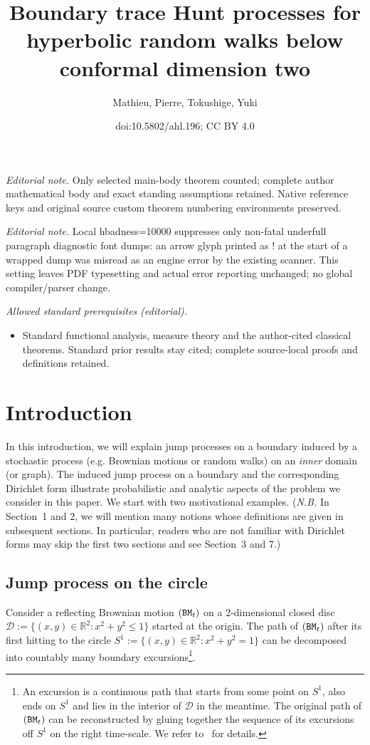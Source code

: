 \documentclass[10pt]{amsart}
\title{Boundary trace Hunt processes for hyperbolic random walks below conformal dimension two}
\author{Mathieu, Pierre, Tokushige, Yuki}
\date{doi:10.5802/ahl.196; CC BY 4.0}
\theoremstyle{definition}\newtheorem{defi}[theo]{Definition}\newtheorem{rema}[theo]{Remark}\newtheorem{exam}[theo]{Example}\newtheorem{exem}[theo]{Example}\newtheorem{nota}[theo]{Notation}
\newcommand{\cd}{\mathcal{D}}
\newcommand{\br}{\mathbb{R}}
\begin{document}
\maketitle
\noindent\textit{Editorial note.} Only selected main-body theorem counted; complete author mathematical body and exact standing assumptions retained. Native reference keys and original source custom theorem numbering environments preserved.\par\medskip
\noindent\textit{Editorial note.} Local hbadness=10000 suppresses only non-fatal underfull paragraph diagnostic font dumps: an arrow glyph printed as ! at the start of a wrapped dump was misread as an engine error by the existing scanner. This setting leaves PDF typesetting and actual error reporting unchanged; no global compiler/parser change.\par\medskip
\noindent\textit{Allowed standard prerequisites (editorial).}\begin{itemize}
\item Standard functional analysis, measure theory and the author-cited classical theorems. Standard prior results stay cited; complete source-local proofs and definitions retained.
\end{itemize}\medskip



\section{Introduction}\label{intro}
In this introduction, we will explain jump processes on a boundary induced by a stochastic process (e.g. Brownian motions or random walks) on an \emph{inner} domain (or graph). The induced jump process on a boundary and the corresponding Dirichlet form illustrate probabilistic and analytic aspects of the problem we consider in this paper. We start with two motivational examples. (\emph{N.B.} In Section~1 and 2, we will mention many notions whose definitions are given in subsequent sections. In particular, readers who are not familiar with Dirichlet forms may skip the first two sections and see Section~3 and 7.)



\subsection*{Jump process on the circle} Consider a reflecting Brownian motion $({\tt BM}_t)$ on a 2-dimensional closed disc $\cd:=\{(x,y)\in\br^2:x^2+y^2\leq1\}$ started at the origin. The path of $({\tt BM}_t)$ after its first hitting to the circle $S^1:=\{(x,y)\in\br^2:x^2+y^2=1\}$ can be decomposed into countably many boundary excursions\footnote{ An excursion is a continuous path that starts from some point on $S^1$, also ends on $S^1$ and lies in the interior of $\cd$ in the meantime. The original path of $({\tt BM}_t)$ can be reconstructed by gluing together the sequence of its excursions off $S^1$ on the right time-scale. We refer to~\cite{Bu} for details.}.
\end{document}
